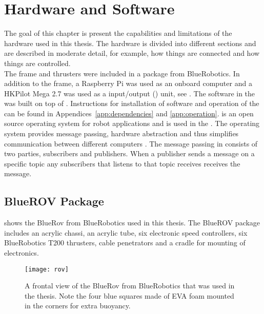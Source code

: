 \chapter{Hardware and Software}\label{cha:hardware}
The goal of this chapter is present the capabilities and limitations of the hardware used in this thesis. The hardware is divided into different sections and are described in moderate detail, for example, how things are connected and how things are controlled.\\
The \abbrROV frame and thrusters were included in a package from BlueRobotics. In addition to the \abbrROV frame, a Raspberry Pi was used as an onboard computer and a HKPilot Mega 2.7  was used as a input/output (\abbrIO) unit, see . The software in the \abbrROV was built on top of \abbrROS.  Instructions for installation of software and operation of the \abbrROV can be found in Appendices~\ref{app:dependencies} and \ref{app:operation}. \abbrROS is an open source operating system for robot applications and is used in the \abbrROV. The operating system provides message passing, hardware abstraction and thus simplifies communication between different computers \citep{ROS}. The message passing in \abbrROS consists of two parties, subscribers and publishers. When a publisher sends a message on a specific topic any subscribers that listens to that topic receives receives the message.  

\section{BlueROV Package}
 shows the BlueRov from BlueRobotics used in this thesis. The BlueROV package includes an acrylic chassi, an acrylic tube, six electronic speed controllers, six BlueRobotics T200 thrusters, cable penetrators and a cradle for mounting of electronics.
\begin{figure}
\centering
\texttt{[image: rov]}
\caption{A frontal view of the BlueRov from BlueRobotics that was used in the thesis.
Note the four blue squares made of EVA foam mounted in the corners for extra buoyancy.}
\label{fig:rov}
\end{figure}

